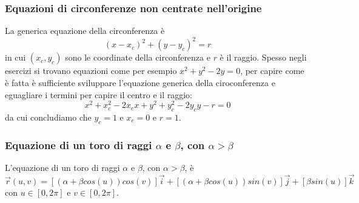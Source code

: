 \subsubsection{Equazioni di circonferenze non centrate nell'origine}
La generica equazione della circonferenza è
\[
    (x-x_c)^2 + (y-y_c)^2 = r
\]
in cui $(x_c, y_c)$ sono le coordinate della circonferenza e $r$ è il raggio.\newline
\newline
Spesso negli esercizi si trovano equazioni come per esempio $x^2 + y^2 -2y = 0$, per capire come è fatta è sufficiente sviluppare l'equazione generica della ciroconferenza e eguagliare i termini per capire il centro e il raggio:
\[
    x^2 + x_c^2 -2x_cx + y^2 + y_c^2 - 2y_cy - r = 0
\]
da cui concludiamo che $y_c = 1$ e $x_c = 0$ e $r=1$.
\subsubsection{Equazione di un toro di raggi $\alpha$ e $\beta$, con $\alpha > \beta$}
L'equazione di un toro di raggi $\alpha$ e $\beta$, con $\alpha > \beta$, è 
\[
    \vec{r}(u,v) = [(\alpha + \beta cos(u))cos(v)]\vec{i} + [(\alpha + \beta cos(u))sin(v)]\vec{j} + [\beta sin (u)]\vec{k}
\]
con $u \in [0,2\pi]$ e $v \in[0,2\pi]$.